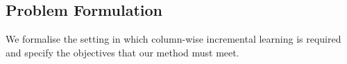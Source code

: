 \documentclass[sigconf]{acmart}
\begin{document}
\begin{itemize}
\begin{table}[ht]
  \caption{Capability matrix (rows = method, columns = key capability)}
  \label{tab:method-comparison-transposed}
  \centering
\end{table}
\section{Problem Formulation}
\label{sec:problem}

We formalise the setting in which column-wise incremental learning is required and specify the objectives that our method must meet.


\end{itemize}
\end{document}
